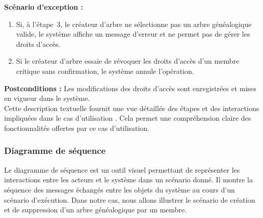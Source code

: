\textbf{Scénario d'exception :}
\begin{enumerate}
  \item Si, à l’étape 3, le créateur d'arbre ne sélectionne pas un arbre généalogique
    valide, le système affiche un message d'erreur et ne permet pas de gérer les droits d'accès.

  \item Si le créateur d'arbre essaie de révoquer les droits d'accès d'un membre
    critique sans confirmation, le système annule l'opération.
\end{enumerate}

\textbf{Postconditions :} Les modifications des droits d'accès sont enregistrées
et mises en vigueur dans le système.
\\

Cette description textuelle fournit une vue détaillée des étapes et des
interactions impliquées dans le cas d’utilisation .
Cela permet une compréhension claire des fonctionnalités offertes par ce cas d’utilisation.


\subsubsection{Diagramme de séquence}

Le diagramme de séquence est un outil visuel permettant de représenter les
interactions entre les acteurs et le système dans un scénario donné. Il montre
la séquence des messages échangés entre les objets du système au cours d’un
scénario d’exécution. Dans notre cas, nous allons illustrer le scénario de
création et de suppression d’un arbre généalogique par un membre.


